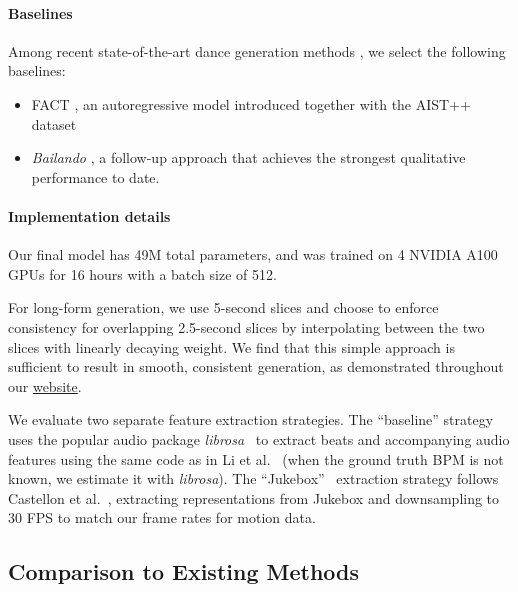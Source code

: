 \documentclass[10pt,twocolumn,letterpaper]{article}
\newcommand{\websitelink}{https://edge-dance.github.io/}
\newcommand{\website}{\href{\websitelink}{website}}
\begin{document}
\paragraph{Baselines}

Among recent state-of-the-art dance generation methods \cite{li2021ai,siyao2022bailando,li2022danceformer,kim2022brand,huang2022genre,pu2022music,fan2022bi,au2022choreograph,valle2021transflower}, we select the following baselines:
\begin{itemize}
    \item FACT \cite{li2021ai}, an autoregressive model introduced together with the AIST++ dataset
    \item \textit{Bailando} \cite{siyao2022bailando}, a follow-up approach that achieves the strongest qualitative performance to date.
\end{itemize}


\vspace{-10pt}

\paragraph{Implementation details}

Our final model has 49M total parameters, and was trained on 4 NVIDIA A100 GPUs for 16 hours with a batch size of 512.

For long-form generation, we use 5-second slices and choose to enforce consistency for overlapping 2.5-second slices by interpolating between the two slices with linearly decaying weight.
We find that this simple approach is sufficient to result in smooth, consistent generation, as demonstrated throughout our \website.

We evaluate two separate feature extraction strategies. The ``baseline'' strategy uses the popular audio package \textit{librosa}~\cite{mcfee2015librosa} to extract beats and accompanying audio features using the same code as in Li et al.~\cite{li2021ai} (when the ground truth BPM is not known, we estimate it with \textit{librosa}). The ``Jukebox''~\cite{dhariwal2020jukebox} extraction strategy follows Castellon et al.~\cite{castellon2021codified}, extracting representations from Jukebox and downsampling to 30 FPS to match our frame rates for motion data.

\subsection{Comparison to Existing Methods}
\end{document}
